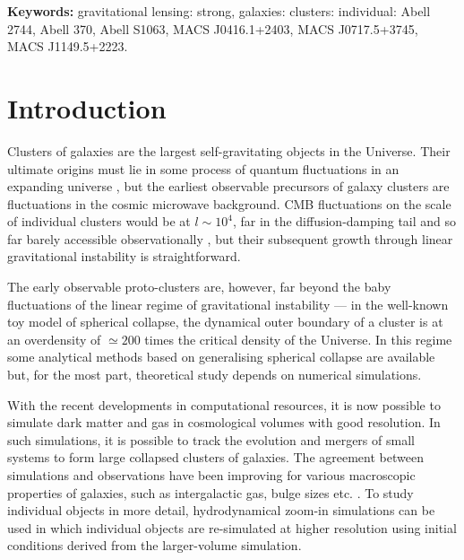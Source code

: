\documentclass[
  11pt,
  twoside,
  openright,
  titlepage,
  headings=optiontoheadandtoc
]{scrbook}
\begin{document}
\vspace{1em}
\noindent\textbf{Keywords:}
gravitational lensing: strong,
galaxies: clusters: individual: Abell 2744,
Abell 370, Abell S1063, MACS J0416.1+2403,
MACS J0717.5+3745, MACS J1149.5+2223.
\par
\vspace{1em}


\section{Introduction}\label{p5:sec:intro}

Clusters of galaxies are the largest self-gravitating objects in the
Universe.  Their ultimate origins must lie in some process of quantum
fluctuations in an expanding universe
\citep{1939Phy.....6..899S,1967RvMP...39..862H,2015PhRvD..91f3505F},
but the earliest observable precursors of galaxy clusters are
fluctuations in the cosmic microwave background.  CMB fluctuations on
the scale of individual clusters would be at $l\sim10^4$, far in the
diffusion-damping tail \citep{1968ApJ...151..459S} and so far barely
accessible observationally \citep{2009ApJ...694.1200R}, but their
subsequent growth through linear gravitational instability is
straightforward.

The early observable proto-clusters
\citep[e.g,][]{2014ApJ...792...15T} are, however, far beyond the baby
fluctuations of the linear regime of gravitational instability --- in
the well-known toy model of spherical collapse, the dynamical outer
boundary of a cluster is at an overdensity of $\simeq 200$ times the
critical density of the Universe.
In this regime some analytical methods based on generalising spherical
collapse are available
\citep{1974ApJ...187..425P,1991ApJ...379..440B,2000MNRAS.318..203S}
but, for the most part, theoretical study depends on numerical
simulations.

With the recent developments in computational resources, it is now possible
to simulate dark matter and gas in cosmological volumes with good
resolution.  In such simulations, it is possible to track the evolution
and mergers of small systems to form large collapsed clusters of
galaxies.  The agreement between simulations and observations have
been improving for various macroscopic properties of galaxies, such as
intergalactic gas, bulge sizes etc.
\citep{2011ApJ...740..102K,2012MNRAS.426.2046A,2012arXiv1206.2838A,
  2014arXiv1407.2600S,2011MNRAS.410.1391A,2013MNRAS.436.3031V,
  2014Natur.509..177V,2014MNRAS.437.1750M,2015MNRAS.446..521S}.  To
study individual objects in more detail, hydrodynamical zoom-in
simulations can be used
\citep{2015MNRAS.446.1939F,2015MNRAS.446.1957F}
in which individual objects are re-simulated at higher resolution
using initial conditions derived from the larger-volume simulation.
\end{document}

